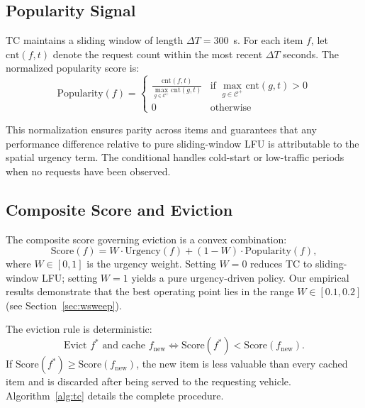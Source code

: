\documentclass[preprint,12pt]{elsarticle}
\begin{document}
	\subsection{Popularity Signal}
	
	TC maintains a sliding window of length $\Delta T = 300$~s. For each item $f$, let $\text{cnt}(f, t)$ denote the request count within the most recent $\Delta T$ seconds. The normalized popularity score is:
	\begin{equation}
		\text{Popularity}(f) = \begin{cases} \frac{\text{cnt}(f, t)}{\max_{g \in \mathcal{C}^+} \text{cnt}(g, t)} & \text{if } \max_{g \in \mathcal{C}^+} \text{cnt}(g, t) > 0 \\ 0 & \text{otherwise} \end{cases}
		\label{eq:popularity_method}
	\end{equation}
	
	This normalization ensures parity across items and guarantees that any performance difference relative to pure sliding-window LFU is attributable to the spatial urgency term. The conditional handles cold-start or low-traffic periods when no requests have been observed.
	
	\subsection{Composite Score and Eviction}
	
	The composite score governing eviction is a convex combination:
	\begin{equation}
		\text{Score}(f) = W \cdot \text{Urgency}(f) + (1 - W) \cdot \text{Popularity}(f),
		\label{eq:score_method}
	\end{equation}
	where $W \in [0, 1]$ is the urgency weight. Setting $W = 0$ reduces TC to sliding-window LFU; setting $W = 1$ yields a pure urgency-driven policy. Our empirical results demonstrate that the best operating point lies in the range $W \in [0.1, 0.2]$ (see Section~\ref{sec:wsweep}).
	
	The eviction rule is deterministic:
	\begin{equation}
		\text{Evict } f^* \text{ and cache } f_\text{new} \iff \text{Score}(f^*) < \text{Score}(f_\text{new}).
		\label{eq:evict_method}
	\end{equation}
	If $\text{Score}(f^*) \geq \text{Score}(f_\text{new})$, the new item is less valuable than every cached item and is discarded after being served to the requesting vehicle. Algorithm~\ref{alg:tc} details the complete procedure.
	
\end{document}
